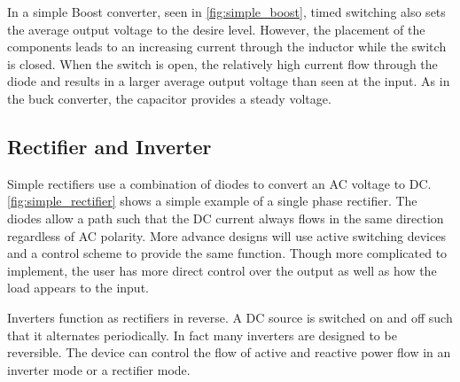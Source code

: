 

In a simple Boost converter, seen in \autoref{fig:simple_boost}, timed switching also sets the average output voltage to the desire level. However, the placement of the components leads to an increasing current through the inductor while the switch is closed. When the switch is open, the relatively high current flow through the diode and results in a larger average output voltage than seen at the input. As in the buck converter, the capacitor provides a steady voltage. 



\subsection{Rectifier and Inverter}
Simple rectifiers use a combination of diodes to convert an AC voltage to DC. \autoref{fig:simple_rectifier} shows a simple example of a single phase rectifier. The diodes allow a path such that the DC current always flows in the same direction regardless of AC polarity. More advance designs will use active switching devices and a control scheme to provide the same function. Though more complicated to implement, the user has more direct control over the output as well as how the load appears to the input. 




Inverters function as rectifiers in reverse. A DC source is switched on and off such that it alternates periodically. In fact many inverters are designed to be reversible. The device can control the flow of active and reactive power flow in an inverter mode or a rectifier mode.


